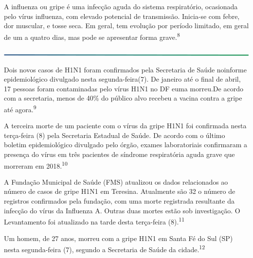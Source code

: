 \documentclass{article}
\begin{document}
{\large %


A influenza ou gripe é uma infecção aguda do sistema respiratório, ocasionada pelo vírus influenza, com elevado potencial de transmissão. Inicia-se com febre, dor muscular, e tosse seca. Em geral, tem evolução por período limitado, em geral de um a quatro dias, mas pode se apresentar forma grave.\textsuperscript{8}

\includegraphics[width=\linewidth]{divisoria_horizontal.png} %


	Dois novos casos de H1N1 foram confirmados pela Secretaria de Saúde noinforme epidemiológico divulgado nesta segunda-feira(7). De janeiro até o final de abril, 17 pessoas foram contaminadas pelo vírus H1N1 no DF euma morreu.De acordo com a secretaria, menos de 40\% do público alvo recebeu a vacina contra a gripe até agora.\textsuperscript{9}

	A terceira morte de um paciente com o vírus da gripe H1N1 foi confirmada nesta terça-feira (8) pela Secretaria Estadual de Saúde. De acordo com o último boletim epidemiológico divulgado pelo órgão, exames laboratoriais confirmaram a presença do vírus em três pacientes de síndrome respiratória aguda grave que morreram em 2018.\textsuperscript{10}
    
	A Fundação Municipal de Saúde (FMS) atualizou os dados relacionados ao número de casos de gripe H1N1 em Teresina. Atualmente são 32 o número de registros confirmados pela fundação, com uma morte registrada resultante da infecção do vírus da Influenza A. Outras duas mortes estão sob investigação. O Levantamento foi atualizado na tarde desta terça-feira (8).\textsuperscript{11}
    
	Um homem, de 27 anos, morreu com a gripe H1N1 em Santa Fé do Sul (SP) nesta segunda-feira (7), segundo a Secretaria de Saúde da cidade.\textsuperscript{12}\\
\\
\par
} %
\end{document}
